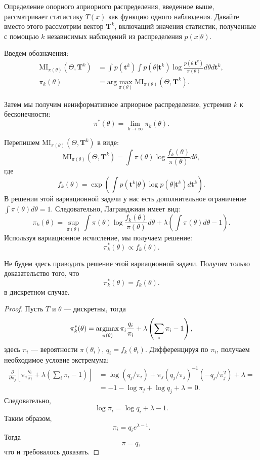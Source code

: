 Определение опорного априорного распределения, введенное выше,
рассматривает статистику $T(x)$ как функцию одного наблюдения.
Давайте вместо этого рассмотрим вектор $\mathbf{T}^k$,
включащий значения статистик, полученные с помощью $k$ независимых наблюдений из распределения $p(x| \theta)$.

Введем обозначения:
\begin{align*}
\mathrm{MI}_{\pi(\theta)}(\Theta, \mathbf{T}^k) &= \int p(\mathbf{t}^k) \int p(\theta | \mathbf{t}^k) \log \frac{p(\theta | \mathbf{t}^k)}{\pi(\theta)} d\theta d\mathbf{t}^k, \\
\pi_k(\theta) &= \mathrm{arg} \max_{\pi(\theta)} \mathrm{MI}_{\pi(\theta)}(\Theta, \mathbf{T}^k).
\end{align*}

Затем мы получим неинформативное априорное распределение, устремив $k$ к бесконечности:
\[
\pi^*(\theta) = \lim_{k \rightarrow \infty} \pi_k(\theta).
\]

Перепишем $\mathrm{MI}_{\pi(\theta)}(\Theta, \mathbf{T}^k)$ в виде:
\[
\mathrm{MI}_{\pi(\theta)}(\Theta, \mathbf{T}^k) = \int \pi(\theta) \log \frac{f_k(\theta)}{\pi(\theta)} d\theta,
\]
где 
\[
f_k(\theta) = \exp \left(\int p(\mathbf{t}^k | \theta) \log p(\theta | \mathbf{t}^k) d \mathbf{t}^k \right).
\]
В решении этой вариационной задачи у нас есть дополнительное ограничение $\int \pi(\theta) d\theta = 1$.
Следовательно, Лагранджиан имеет вид:
\[
\pi_k(\theta) = \sup_{\pi(\theta)} \int \pi(\theta) \log \frac{f_k(\theta)}{\pi(\theta)} d\theta + \lambda \left(\int \pi(\theta) d\theta - 1 \right).
\]
Используя вариационное исчисление, мы получаем решение:
\[
\pi^*_k(\theta) \propto f_k(\theta).
\]

Не будем здесь приводить решение этой вариационной задачи.
Получим только доказательство того, что 
\[
\pi^*_k(\theta) = f_k(\theta).
\]
в дискретном случае.
\begin{proof}
Пусть $T$ и $\theta$ --- дискретны, тогда
\[
\pi^*_k(\theta) = \argmax_{\pi(\theta)} \pi_i \frac{q_i}{\pi_i} + \lambda \left(\sum_i \pi_i - 1\right),
\]
здесь $\pi_i$ --- вероятности $\pi(\theta_i)$, $q_i = f_k(\theta_i)$.
Дифференцируя по $\pi_i$, получаем необходимое условие экстремума:
\begin{align*}
\frac{\partial}{\partial \pi_j} \left[ \pi_i \frac{q_i}{\pi_i} + \lambda \left(\sum_i \pi_i - 1\right)\right] &= \log (q_j / \pi_i) + \pi_j (q_j / \pi_j)^{-1} (-q_j / \pi_j^2) + \lambda= \\
&= -1 -\log \pi_j + \log q_j + \lambda = 0.
\end{align*}
Следовательно,
\[
\log \pi_i = \log q_i + \lambda - 1.
\]
Таким образом,
\[
\pi_i = q_i e^{\lambda - 1}.
\]
Тогда 
\[
\pi = q,
\]
что и требовалось доказать.
\end{proof}

